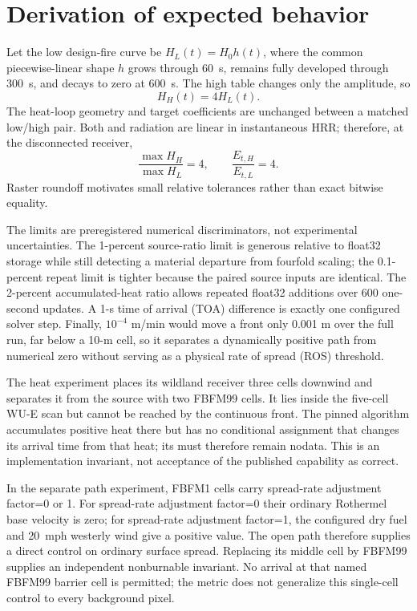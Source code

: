 \section{Derivation of expected behavior}
Let the low design-fire curve be $H_L(t)=H_0h(t)$, where the common
piecewise-linear shape $h$ grows through \SI{60}{s}, remains fully developed
through \SI{300}{s}, and decays to zero at \SI{600}{s}.  The high table changes
only the amplitude, so
\begin{equation}H_H(t)=4H_L(t).
\end{equation}
The heat-loop geometry and target coefficients are unchanged between a matched
low/high pair.  Both \DFC{} and radiation are linear in instantaneous HRR;
therefore, at the disconnected receiver,
\begin{equation}
 \frac{\max H_H}{\max H_L}=4,
 \qquad \frac{E_{t,H}}{E_{t,L}}=4.
\end{equation}
Raster roundoff motivates small relative tolerances rather than exact bitwise
equality.

The limits are preregistered numerical discriminators, not experimental
uncertainties.  The 1-percent source-ratio limit is generous relative to
float32 storage while still detecting a material departure from fourfold
scaling; the 0.1-percent repeat limit is tighter because the paired source
inputs are identical.  The 2-percent accumulated-heat ratio allows repeated
float32 additions over 600 one-second updates.  A 1-s time of arrival (TOA) difference is exactly
one configured solver step.  Finally, $10^{-4}$ m/min would move a front only
0.001 m over the full run, far below a 10-m cell, so it separates a dynamically
positive path from numerical zero without serving as a physical rate of spread (ROS) threshold.

The heat experiment places its wildland receiver three cells downwind and
separates it from the source with two FBFM99 cells.  It lies inside the
five-cell WU-E scan but cannot be reached by the continuous front.  The pinned
algorithm accumulates positive heat there but has no conditional assignment
that changes its arrival time from that heat; its \TOA{} must therefore remain
nodata.  This is an implementation invariant, not acceptance of the published
capability as correct.

In the separate path experiment, FBFM1 cells carry spread-rate adjustment factor=0 or 1.
For spread-rate adjustment factor=0 their ordinary Rothermel base velocity is zero; for
spread-rate adjustment factor=1, the configured dry fuel and \SI{20}{mph} westerly wind give a
positive value.  The open path therefore supplies a direct control on ordinary
surface spread.  Replacing its middle cell by FBFM99 supplies an independent
nonburnable invariant.  No arrival at that named FBFM99 barrier cell is
permitted; the metric does not generalize this single-cell control to every
background pixel.

